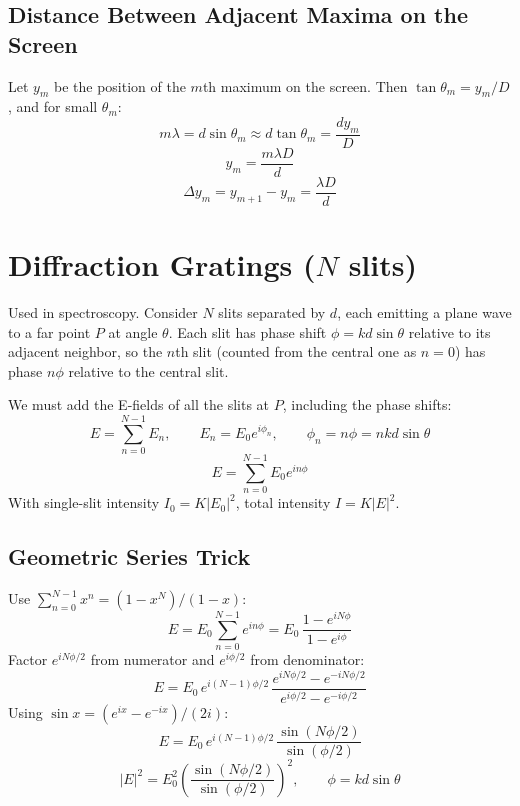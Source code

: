 \documentclass[11pt]{report}
\begin{document}
\subsection*{Distance Between Adjacent Maxima on the Screen}

Let $y_m$ be the position of the $m$th maximum on the screen. Then $\tan\theta_m = y_m/D$, and for small $\theta_m$:
\begin{equation}
m\lambda = d\sin\theta_m \approx d\tan\theta_m = \frac{d y_m}{D}
\end{equation}
\begin{equation}
y_m = \frac{m\lambda D}{d}
\end{equation}
\begin{equation}
\boxed{\Delta y_m = y_{m+1} - y_m = \frac{\lambda D}{d}}
\end{equation}

\section{Diffraction Gratings ($N$ slits)}

Used in spectroscopy. Consider $N$ slits separated by $d$, each emitting a plane wave to a far point $P$ at angle $\theta$. Each slit has phase shift $\phi = kd\sin\theta$ relative to its adjacent neighbor, so the $n$th slit (counted from the central one as $n=0$) has phase $n\phi$ relative to the central slit.

We must add the E-fields of all the slits at $P$, including the phase shifts:
\begin{equation}
E = \sum_{n=0}^{N-1} E_n, \qquad E_n = E_0 e^{i\phi_n}, \qquad \phi_n = n\phi = n k d\sin\theta
\end{equation}
\begin{equation}
E = \sum_{n=0}^{N-1} E_0 e^{in\phi}
\end{equation}
With single-slit intensity $I_0 = K|E_0|^2$, total intensity $I = K|E|^2$.

\subsection*{Geometric Series Trick}

Use $\sum_{n=0}^{N-1} x^n = (1-x^N)/(1-x)$:
\begin{equation}
E = E_0 \sum_{n=0}^{N-1} e^{in\phi} = E_0\,\frac{1 - e^{iN\phi}}{1 - e^{i\phi}}
\end{equation}
Factor $e^{iN\phi/2}$ from numerator and $e^{i\phi/2}$ from denominator:
\begin{equation}
E = E_0\, e^{i(N-1)\phi/2}\,\frac{e^{iN\phi/2} - e^{-iN\phi/2}}{e^{i\phi/2} - e^{-i\phi/2}}
\end{equation}
Using $\sin x = (e^{ix} - e^{-ix})/(2i)$:
\begin{equation}
\boxed{E = E_0\, e^{i(N-1)\phi/2}\,\frac{\sin(N\phi/2)}{\sin(\phi/2)}}
\end{equation}
\begin{equation}
\boxed{|E|^2 = E_0^2 \left(\frac{\sin(N\phi/2)}{\sin(\phi/2)}\right)^2, \qquad \phi = kd\sin\theta}
\end{equation}
\end{document}

